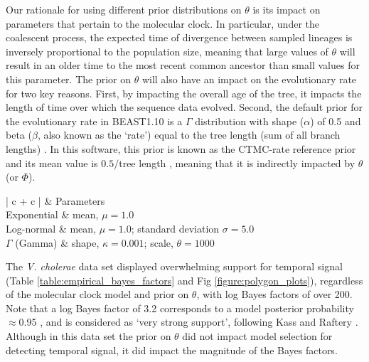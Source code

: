 \documentclass[10pt,letterpaper]{article}
\newlength\savedwidth
\newcommand\thickhline{\noalign{\global\savedwidth\arrayrulewidth\global\arrayrulewidth 2pt}%
\hline
\noalign{\global\arrayrulewidth\savedwidth}}
\begin{document}
Our rationale for using different prior distributions on $\theta$ is its impact on parameters that pertain to the molecular clock. In particular, under the coalescent process, the expected time of divergence between sampled lineages is inversely proportional to the population size, meaning that large values of $\theta$ will result in an older time to the most recent common ancestor than small values for this parameter. The prior on $\theta$ will also have an impact on the evolutionary rate for two key reasons. First, by impacting the overall age of the tree, it impacts the length of time over which the sequence data evolved. Second, the default prior for the evolutionary rate in BEAST1.10 is a $\Gamma$ distribution with shape ($\alpha$) of 0.5 and beta ($\beta$, also known as the `rate') equal to the tree length (sum of all branch lengths) \cite{wang2014priors, ferreira2008bayesian}. In this software, this prior is known as the CTMC-rate reference prior and its mean value is $0.5 /$tree length \cite{ferreira2008bayesian}, meaning that it is indirectly impacted by $\theta$ (or $\Phi$). 

\begin{table}[h]
\caption{Prior distributions for the effective population size of the constant-size coalescent (known as $\theta$ in the constant-size coalescent and different to the scale parameter of the $\Gamma$ distribution).}
\begin{center} 
	\label{table:prior_distros_on_Phi}
	\begin{tabular}{| c + c |}
    \hline
		 & Parameters\\ \thickhline
		Exponential & mean, $\mu=1.0$\\ \hline
		Log-normal & mean, $\mu=1.0$; standard deviation $\sigma=5.0$\\ \hline
		$\Gamma$ (Gamma) & shape, $\kappa=0.001$; scale, $\theta=1000$\\ \hline
	\end{tabular}
\end{center}
\end{table}

The \textit{V. cholerae} data set displayed overwhelming support for temporal signal (Table \ref{table:empirical_bayes_factors} and Fig \ref{figure:polygon_plots}), regardless of the molecular clock model and prior on $\theta$, with log Bayes factors of over 200. Note that a log Bayes factor of 3.2 corresponds to a model posterior probability $\approx$0.95 \cite{tay2023detecting}, and is considered as `very strong support', following Kass and Raftery \cite{kass1995bayes}. Although in this data set the prior on $\theta$ did not impact model selection for detecting temporal signal, it did impact the magnitude of the Bayes factors.
\end{document}
